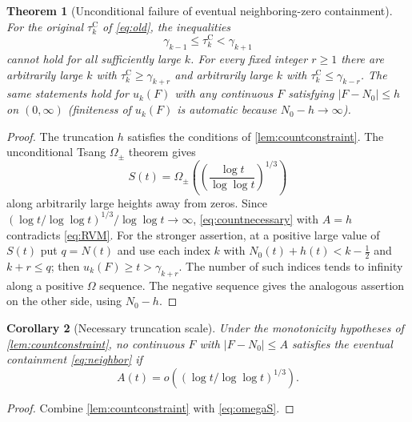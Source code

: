 \documentclass[11pt,a4paper]{article}
\numberwithin{equation}{section}
\newtheorem{theorem}{Theorem}[section]
\newtheorem{corollary}[theorem]{Corollary}
\theoremstyle{definition}
\theoremstyle{remark}
\begin{document}
\begin{theorem}[Unconditional failure of eventual neighboring-zero containment]\label{thm:omega}
For the original $\tau_k^{\mathrm C}$ of \eqref{eq:old}, the inequalities
\begin{equation}\label{eq:impossible}
\gamma_{k-1}\le\tau_k^{\mathrm C}<\gamma_{k+1}
\end{equation}
cannot hold for all sufficiently large $k$. For every fixed integer $r\ge1$ there are arbitrarily large $k$ with $\tau_k^{\mathrm C}\ge\gamma_{k+r}$ and arbitrarily large $k$ with $\tau_k^{\mathrm C}\le\gamma_{k-r}$. The same statements hold for $u_k(F)$ with any continuous $F$ satisfying $|F-N_0|\le h$ on $(0,\infty)$ (finiteness of $u_k(F)$ is automatic because $N_0-h\to\infty$).
\end{theorem}
\begin{proof}
The truncation $h$ satisfies the conditions of \cref{lem:countconstraint}. The unconditional Tsang $\Omega_\pm$ theorem \cite{Tsang1986,Dobner2024} gives
\begin{equation}\label{eq:omegaS}
S(t)=\Omega_\pm\!\left(\left(\frac{\log t}{\log\log t}\right)^{1/3}\right)
\end{equation}
along arbitrarily large heights away from zeros. Since
$(\log t/\log\log t)^{1/3}/\log\log t\to\infty$,
\eqref{eq:countnecessary} with $A=h$ contradicts \eqref{eq:RVM}.
For the stronger assertion, at a positive large value of $S(t)$ put $q=N(t)$ and use each index $k$ with $N_0(t)+h(t)<k-\tfrac12$ and $k+r\le q$; then
$u_k(F)\ge t>\gamma_{k+r}$. The number of such indices tends to infinity along a positive $\Omega$ sequence. The negative sequence gives the analogous assertion on the other side, using $N_0-h$.
\end{proof}

\begin{corollary}[Necessary truncation scale]\label{cor:amp}
Under the monotonicity hypotheses of \cref{lem:countconstraint}, no continuous $F$ with $|F-N_0|\le A$ satisfies the eventual containment \eqref{eq:neighbor} if
\begin{equation}\label{eq:amp-scale}
A(t)=o\!\left((\log t/\log\log t)^{1/3}\right).
\end{equation}
\end{corollary}
\begin{proof}Combine \cref{lem:countconstraint} with \eqref{eq:omegaS}.\end{proof}
\end{document}
